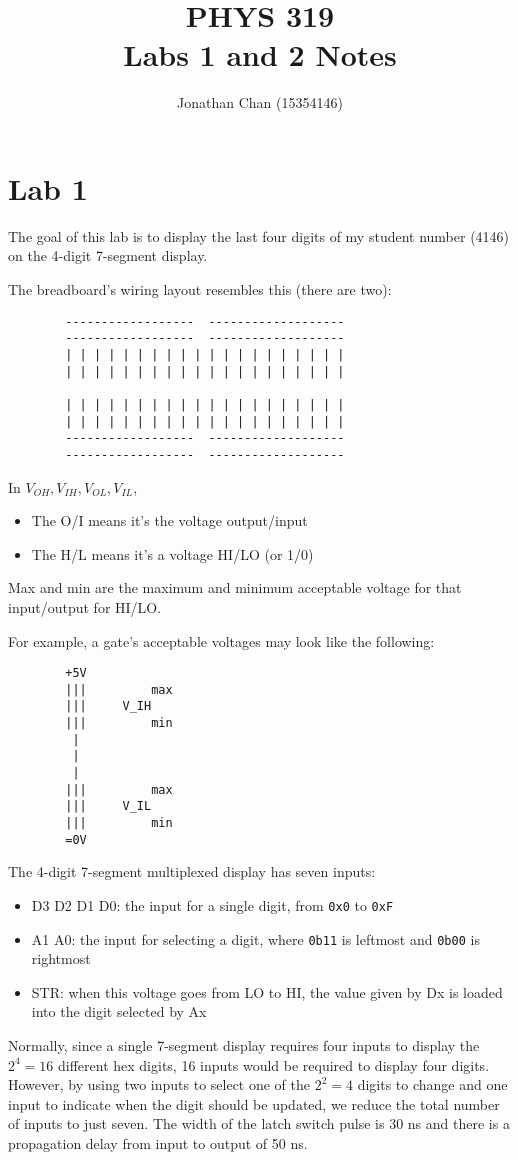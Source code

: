 \documentclass[11pt]{article}
\author{Jonathan Chan (15354146)}
\title{PHYS 319\\Labs 1 and 2 Notes}
\begin{document}
	\maketitle
	
	\section{Lab 1}
		The goal of this lab is to display the last four digits of my student number (4146) on the 4-digit 7-segment display.
		
		The breadboard's wiring layout resembles this (there are two):
	\begin{verbatim}
		------------------  -------------------
		------------------  -------------------
		| | | | | | | | | | | | | | | | | | | |
		| | | | | | | | | | | | | | | | | | | |
		
		| | | | | | | | | | | | | | | | | | | |
		| | | | | | | | | | | | | | | | | | | |
		------------------  -------------------
		------------------  -------------------
	\end{verbatim}
		In $V_{OH}, V_{IH}, V_{OL}, V_{IL}$, 
	\begin{itemize}
		\item The O/I means it's the voltage output/input
		\item The H/L means it's a voltage HI/LO (or 1/0)
	\end{itemize}
		Max and min are the maximum and minimum acceptable voltage for that input/output for HI/LO.
	
		For example, a gate's acceptable voltages may look like the following:
	\begin{verbatim}
		+5V
		|||         max
		|||     V_IH
		|||         min
		 |
		 |
		 |
		|||         max
		|||     V_IL
		|||         min
		=0V
	\end{verbatim}
		The 4-digit 7-segment multiplexed display has seven inputs:
	\begin{itemize}
		\item D3 D2 D1 D0: the input for a single digit, from \texttt{0x0} to \texttt{0xF}
		\item  A1 A0:      the input for selecting a digit, where \texttt{0b11} is leftmost and \texttt{0b00} is rightmost
		\item STR:         when this voltage goes from LO to HI, the value given by Dx is loaded into the digit selected by Ax
	\end{itemize}
		Normally, since a single 7-segment display requires four inputs to display the $2^4 = 16$ different hex digits, 16 inputs would be required to display four digits. However, by using two inputs to select one of the $2^2 = 4$ digits to change and one input to indicate when the digit should be updated, we reduce the total number of inputs to just seven. The width of the latch switch pulse is 30 ns and there is a propagation delay from input to output of 50 ns.
	
\end{document}

